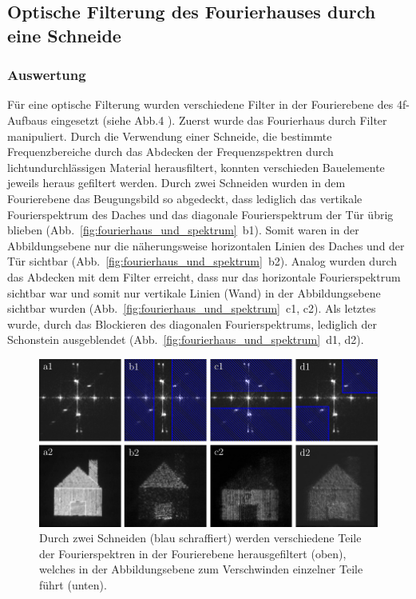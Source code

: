 \subsection{Optische Filterung des Fourierhauses durch eine Schneide}
\subsubsection*{Auswertung}

Für eine optische Filterung wurden verschiedene Filter in der Fourierebene des 4f-Aufbaus eingesetzt (siehe Abb.4%
). Zuerst wurde das Fourierhaus durch Filter manipuliert. Durch die Verwendung einer Schneide, die bestimmte Frequenzbereiche durch das Abdecken der Frequenzspektren durch lichtundurchlässigen Material herausfiltert, konnten verschieden Bauelemente jeweils heraus gefiltert werden. Durch zwei Schneiden wurden in dem Fourierebene das Beugungsbild so abgedeckt, dass lediglich das vertikale Fourierspektrum des Daches und das diagonale Fourierspektrum der Tür übrig blieben (Abb.~\ref{fig:fourierhaus_und_spektrum}~b1). Somit waren in der Abbildungsebene nur die näherungsweise horizontalen Linien des Daches und der Tür sichtbar (Abb.~\ref{fig:fourierhaus_und_spektrum}~b2). Analog wurden durch das Abdecken mit dem Filter erreicht, dass nur das horizontale Fourierspektrum sichtbar war und somit nur vertikale Linien (Wand) in der Abbildungsebene sichtbar wurden (Abb.~\ref{fig:fourierhaus_und_spektrum}~c1, c2). Als letztes wurde, durch das Blockieren des diagonalen Fourierspektrums, lediglich der Schonstein ausgeblendet (Abb.~\ref{fig:fourierhaus_und_spektrum}~d1, d2).

\begin{figure}[h]
	\centering
	\includegraphics[scale=1]{images/Regina/abb21.pdf}
	
	\caption[Fourierhaus mit verschiedenen Filtern]{
		Durch zwei Schneiden (blau schraffiert) werden verschiedene Teile der Fourierspektren in der Fourierebene herausgefiltert (oben), welches in der Abbildungsebene zum Verschwinden einzelner Teile führt (unten).
	}
	\label{fig:fourierhaus_mit_filtern}
\end{figure}

